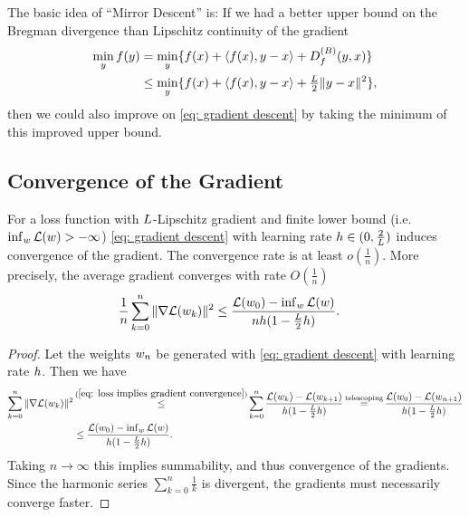\begin{remark}\label{rem: mirror descent}
	The basic idea of ``Mirror Descent''
	\parencite[e.g.][]{guptaAdvancedAlgorithmsFall2020,chenLargeScaleOptimizationData2019,bubeckConvexOptimizationAlgorithms2015}
	is: If we had a better upper bound on the Bregman divergence than Lipschitz
	continuity of the gradient 
	\begin{align*}
		\min_y f(y)
		&= \min_y \{f(x) + \langle f(x), y-x\rangle +D^{(B)}_{f}(y,x)\} \\
		&\le \min_y\{f(x) + \langle f(x), y-x\rangle +\tfrac{L}{2} \|y-x\|^2\},
	\end{align*}
	then we could also improve on \ref{eq: gradient descent} by taking the minimum of this
	improved upper bound.
\end{remark}

\subsection{Convergence of the Gradient}

\begin{theorem}
	\label{thm: convergence of the gradient (only lip cont)}
	For a loss function with \(L\)-Lipschitz gradient and finite lower bound
	(i.e.\ \(\inf_{w}\mathcal{L}(w) >-\infty\)) \ref{eq: gradient descent} with
	learning rate \(h\in(0,\tfrac2{L})\) induces convergence of the gradient.
	The convergence rate is at least \(o(\tfrac1n)\). More precisely, the average
	gradient converges with rate \(O(\tfrac1n)\)
	\begin{align*}
		\frac1{n}\sum_{k=0}^n \|\nabla\mathcal{L}(w_k)\|^2
		&\le \frac{\mathcal{L}(w_0) - \inf_{w}\mathcal{L}(w)}{nh(1-\tfrac{L}2h)}.
	\end{align*} 
\end{theorem}
\begin{proof}
	Let the weights \(w_n\) be generated with \ref{eq: gradient descent} with learning rate \(h\).
	Then we have	
	\begin{align*}
		\sum_{k=0}^n \|\nabla\Loss(\weights_k)\|^2
		&\xle{(\ref{eq: loss implies gradient convergence})}
		\sum_{k=0}^n \frac{\Loss(\weights_k) - \Loss(\weights_{k+1})}{\lr(1-\tfrac{\ubound}2\lr)}
		\xeq{\text{telescoping}} \frac{\Loss(\weights_0) - \Loss(\weights_{n+1})}{\lr(1-\tfrac{\ubound}2\lr)}
		\\
		&\le \frac{\Loss(\weights_0)
		- \inf_{\weights}\Loss(\weights)}{\lr(1-\tfrac{\ubound}2\lr)}.
	\end{align*}
	Taking \(n\to\infty\) this implies summability, and thus convergence of the
	gradients. Since the harmonic series \(\sum_{k=0}^n \tfrac1{k}\) is divergent,
	the gradients must necessarily converge faster.
\end{proof}

